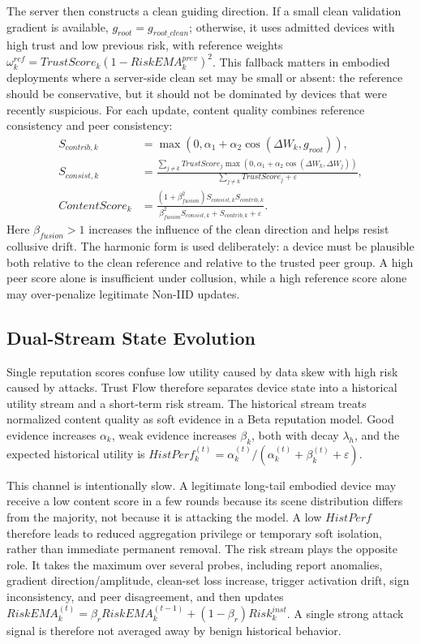 \documentclass[runningheads,orivec]{llncs}
\begin{document}
The server then constructs a clean guiding direction. If a small clean validation gradient is available, $g_{root}=g_{root\_clean}$; otherwise, it uses admitted devices with high trust and low previous risk, with reference weights $\omega_k^{ref}=TrustScore_k(1-RiskEMA_k^{prev})^2$. This fallback matters in embodied deployments where a server-side clean set may be small or absent: the reference should be conservative, but it should not be dominated by devices that were recently suspicious. For each update, content quality combines reference consistency and peer consistency:
\begin{align}
    S_{contrib,k}  & =\max(0,\alpha_1+\alpha_2\cos(\Delta W_k,g_{root})),                                  \\
    S_{consist,k}  & =\frac{\sum_{j\ne k}TrustScore_j\max(0,\alpha_1+\alpha_2\cos(\Delta W_k,\Delta W_j))}
    {\sum_{j\ne k}TrustScore_j+\varepsilon},                                                               \\
    ContentScore_k & =\frac{(1+\beta_{fusion}^2)S_{consist,k}S_{contrib,k}}
    {\beta_{fusion}^2S_{consist,k}+S_{contrib,k}+\varepsilon}.
\end{align}
Here $\beta_{fusion}>1$ increases the influence of the clean direction and helps resist collusive drift. The harmonic form is used deliberately: a device must be plausible both relative to the clean reference and relative to the trusted peer group. A high peer score alone is insufficient under collusion, while a high reference score alone may over-penalize legitimate Non-IID updates.

\subsection{Dual-Stream State Evolution}

Single reputation scores confuse low utility caused by data skew with high risk caused by attacks. Trust Flow therefore separates device state into a historical utility stream and a short-term risk stream. The historical stream treats normalized content quality as soft evidence in a Beta reputation model. Good evidence increases $\alpha_k$, weak evidence increases $\beta_k$, both with decay $\lambda_h$, and the expected historical utility is $HistPerf_k^{(t)}=\alpha_k^{(t)}/(\alpha_k^{(t)}+\beta_k^{(t)}+\varepsilon)$.

This channel is intentionally slow. A legitimate long-tail embodied device may receive a low content score in a few rounds because its scene distribution differs from the majority, not because it is attacking the model. A low $HistPerf$ therefore leads to reduced aggregation privilege or temporary soft isolation, rather than immediate permanent removal. The risk stream plays the opposite role. It takes the maximum over several probes, including report anomalies, gradient direction/amplitude, clean-set loss increase, trigger activation drift, sign inconsistency, and peer disagreement, and then updates $RiskEMA_k^{(t)}=\beta_rRiskEMA_k^{(t-1)}+(1-\beta_r)Risk_k^{inst}$. A single strong attack signal is therefore not averaged away by benign historical behavior.
\end{document}
